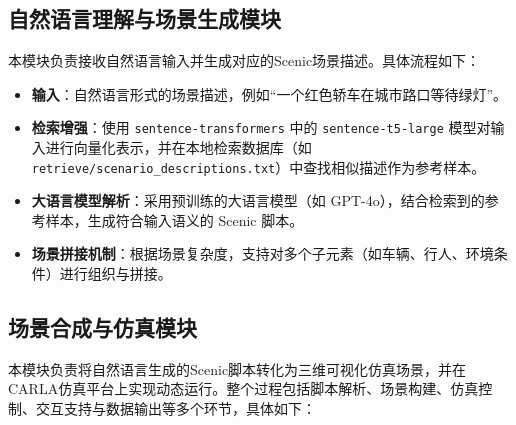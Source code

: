 \subsection{自然语言理解与场景生成模块}
本模块负责接收自然语言输入并生成对应的Scenic场景描述。具体流程如下：
\begin{itemize}
	\item \textbf{输入}：自然语言形式的场景描述，例如“一个红色轿车在城市路口等待绿灯”。
	\item \textbf{检索增强}：使用 \texttt{sentence-transformers} 中的 \texttt{sentence-t5-large} 模型对输入进行向量化表示，并在本地检索数据库（如 \texttt{retrieve/scenario\_descriptions.txt}）中查找相似描述作为参考样本。
	\item \textbf{大语言模型解析}：采用预训练的大语言模型（如 GPT-4o），结合检索到的参考样本，生成符合输入语义的 Scenic 脚本。
	\item \textbf{场景拼接机制}：根据场景复杂度，支持对多个子元素（如车辆、行人、环境条件）进行组织与拼接。
\end{itemize}


\subsection{场景合成与仿真模块}

本模块负责将自然语言生成的Scenic脚本转化为三维可视化仿真场景，并在CARLA仿真平台上实现动态运行。整个过程包括脚本解析、场景构建、仿真控制、交互支持与数据输出等多个环节，具体如下：

